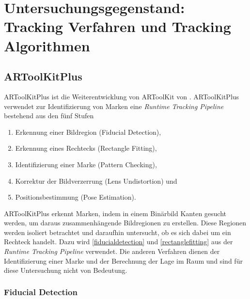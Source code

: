 \section{Untersuchungsgegenstand: Tracking Verfahren und Tracking Algorithmen} %
\label{sec:untersuchungsgegenstand}
\begin{comment}
	Untersuchungsgegenstand: Verfahren und Algorithmen präzise vorstellen und ihre Unterschiede hervorheben.
	Notwendige Kriterien der Algorithmen bestimmen

	Grober Ablauf der Verfahren:
	* Wer hat es erfunden?
	* Wie ist das Verfahren aufgebaut (Algorithmen in grob)
	* Welche Kriterien müssen erfüllt sein (monochrom, rgb Eingabe)?
\end{comment}

\subsection{ARToolKitPlus} %
\label{sub:artoolkitplus}

ARToolKitPlus ist die Weiterentwicklung von ARToolKit von \citeauthor{wagner07b}. ARToolKitPlus verwendet zur
Identifizierung von Marken eine \textit{Runtime Tracking Pipeline} bestehend aus den fünf Stufen

\begin{enumerate}
	\item Erkennung einer Bildregion (Fiducial Detection), \label{fiducialdetection}
	\item Erkennung eines Rechtecks (Rectangle Fitting), \label{rectanglefitting}
	\item Identifizierung einer Marke (Pattern Checking),
	\item Korrektur der Bildverzerrung (Lens Undistortion) und
	\item Positionsbestimmung (Pose Estimation).
\end{enumerate}

ARToolKitPlus erkennt Marken, indem in einem Binärbild Kanten gesucht werden, um daraus zusammenhängende Bildregionen
 zu erstellen. Diese Regionen werden isoliert betrachtet und daraufhin untersucht, ob es sich dabei um ein Rechteck
 handelt. Dazu wird \autoref{fiducialdetection} und \autoref{rectanglefitting} aus der
 \textit{Runtime Tracking Pipeline} verwendet. Die anderen Verfahren dienen der Identifizierung einer Marke und der
 Berechnung der Lage im Raum und sind für diese Untersuchung nicht von Bedeutung.

\subsubsection{Fiducial Detection} %
\label{sub:fiducial_detection}

